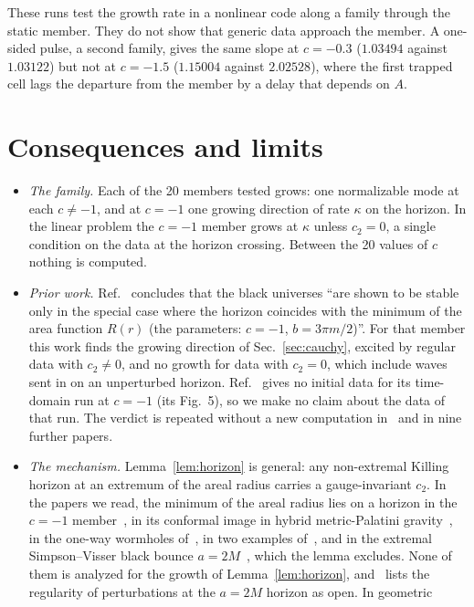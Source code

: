 \documentclass[11pt]{article}
\theoremstyle{plain}
\begin{document}
These runs test the growth rate in a nonlinear code along a family through the static member. They do not show that generic
data approach the member. A one-sided pulse, a second family, gives the same slope at $c=-0.3$ ($1.03494$ against
$1.03122$) but not at $c=-1.5$ ($1.15004$ against $2.02528$), where the first trapped cell lags the departure from the member by
a delay that depends on $A$.

\section{Consequences and limits}\label{sec:limits}

\begin{itemize}
\item \emph{The family.} Each of the 20 members tested grows: one normalizable mode at each $c\ne-1$, and at $c=-1$ one
  growing direction of rate $\kappa$ on the horizon. In the linear problem the $c=-1$ member grows at $\kappa$ unless
  $c_2=0$, a single condition on the data at the horizon crossing. Between the 20 values of $c$ nothing is computed.
\item \emph{Prior work.} Ref.~\cite{BKZ12} concludes that the black universes ``are shown to be stable only in the special
  case where the horizon coincides with the minimum of the area function $R(r)$ (the parameters: $c=-1$, $b=3\pi m/2$)''.
  For that member this work finds the growing direction of Sec.~\ref{sec:cauchy}, excited by regular data with $c_2\ne0$, and no
  growth for data with $c_2=0$, which include waves sent in on an unperturbed horizon. Ref.~\cite{BKZ12} gives no initial
  data for its time-domain run at $c=-1$ (its Fig.~5), so we make no claim about the data of that run. The verdict is
  repeated without a new computation in~\cite{Bro18,BBS20} and in nine further papers.
\item \emph{The mechanism.} Lemma~\ref{lem:horizon} is general: any non-extremal Killing horizon at an extremum of the
  areal radius carries a gauge-invariant $c_2$. In the papers we read, the minimum of the areal radius lies on a horizon in
  the $c=-1$ member~\cite{BF06,BKZ12}, in its conformal image in hybrid metric-Palatini gravity~\cite{BBS20}, in the one-way
  wormholes of~\cite{RJLR25}, in two examples of~\cite{BBS21}, and in the extremal Simpson--Visser black bounce
  $a=2M$~\cite{SV19,LRSSV21}, which the lemma excludes. None of them is analyzed for the growth of
  Lemma~\ref{lem:horizon}, and~\cite{BIK26} lists the regularity of perturbations at the $a=2M$ horizon as open. In geometric

\end{itemize}
\end{document}
